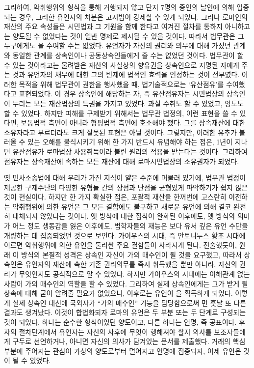 그리하여,
악취행위의 형식을 통해 거행되지 않고
단지 7명의 증인의 날인에 의해 입증되는 경우,
그러한 유언자의 처분은 고시법이 강제할 수 있게 되었다.
그러나
로마인의 재산의 주요 속성들은
시민법과 그 기원을 함께 한다고 여겨진 절차를 통하지 아니하고는
양도될 수 없었다는 것이 일반 명제로 제시될 수 있을 것이다.
따라서 법무관은 그 누구에게도 을 수여할 수는 없었다.
유언자가 자신의 권리와 의무에 대해 가졌던 관계와 동일한 관계를
상속인이나 공동상속인들에게 줄 수는 없었던 것이다.
법무관이 할 수 있는 것이라고는
물려받은 재산의 사실상의 향유권을
상속인으로 지명된 자에게
주는 것과
유언자의 채무에 대한 그의 변제에 법적인 효력을 인정하는 것이
전부였다.
이러한 목적을 위해 법무관이 권한을 행사했을 때,
법기술적으로는
`유산점유'를 수여했다고
표현되었다.
이 경우 상속인에 해당하는 자, 즉 유산점유자는
시민법상의 상속인이 누리는 모든 재산법상의 특권을 가지고 있었다.
과실 수취도 할 수 있었고, 양도도 할 수 있었다.
하지만 피해를 구제받기 위해서는 법무관 법정의,
이런 표현을 쓸 수 있다면, 보통법적 측면이 아니라
형평법적 측면에 호소해야 했다.
그를 상속재산에 대한  소유자라고
부르더라도 크게 잘못된 표현은 아닐 것이다.
그렇지만,
이러한 유추가 불러올 수 있는 오해를 불식시키기 위해
한 가지 반드시 유념해야 하는 점은,
1년이 지나면
유산점유가
로마법상 사용취득이라 불린 원리의 적용을 받는다는 것이다.
그리하여
점유자는 상속재산에 속하는 모든 재산에 대해
로마시민법상의 소유권자가 되었다.

옛 민사소송법에 대해 우리가 가진 지식이 얕은 수준에 머물러 있기에,
법무관 법정이 제공한 구제수단의 다양한 유형들 간의 장점과 단점을
균형있게 파악하기가 쉽지 않은 것이 현실이다.
하지만 한 가지 확실한 점은,
포괄적 재산을 한꺼번에 고스란히 이전하는 악취행위에 의한 유언은
그 모든 결함에도 불구하고
새로운 유언에 의해 결코 완전히 대체되지 않았다는 것이다.
옛 방식에 대한 집착이 완화된 이후에도,
옛 방식의 의미가 어느 정도 생동감을 잃은 이후에도,
법학자들의 재능은 보다 유서 깊은 유언 수단을 개량하는 데
집중되었던 것으로 보인다.
가이우스의 시대, 즉 안토니누스 황조 시대에 이르면
악취행위에 의한 유언을 둘러싼 주요 결함들이 사라지게 된다.
전술했듯이, 원래 이 방식의 본질적 성격은
상속인 자신이 가의 매수인이 될 것을 요구했고,
따라서 상속인은
유언자의 재산에 속한 기존 권리의무를 즉시 취득했을 뿐만 아니라,
자신의 권리가 무엇인지도 공식적으로 알 수 있었다.
하지만 가이우스의 시대에는
이해관계 없는 사람이 가의 매수인의 역할을 할 수 있었다.
그리하여 실제 상속인에게는 그가 받게 될 상속에 대해 굳이 알려줄 필요가 없었으니,
이후로는 유언이 을 획득하게 되었다.
이렇게 실제 상속인 대신에 국외자가 ``가의 매수인'' 기능을 담당함으로써
먼 훗날 또 다른 결과도 생겨났다.
이것이 합법화되자 로마의 유언은 두 부분 또는 두 단계로
구성되는 것이 되었다.
하나는 순수한 형식이었던 양도이고,
다른 하나는 언명, 즉 공표이다.
후자의 절차단계에서 유언자는
자신의 사후에 무엇이 행해져야 할지 의사를 보조자들에게 구두로 선언하거나,
아니면 자신의 의사가 담겨있는 문서를 제출했다.
거래의 핵심 부분에 주어지는 관심이
가상의 양도로부터 멀어지고
언명에 집중되자,
이제 유언은  것이 될 수 있었다.

